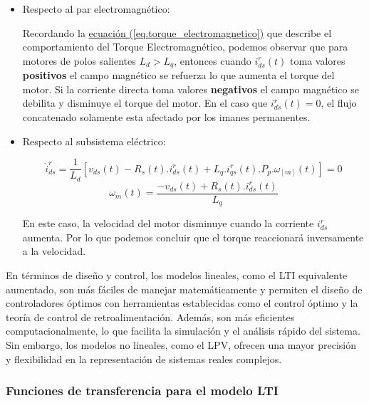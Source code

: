 \documentclass{article}
\begin{document}
\begin{itemize}
    
    \item Respecto al par electromagnético:
    
    Recordando la
    \hyperref[eq.torque_electromagnetico]{ecuación (\ref*{eq.torque_electromagnetico})}
    que describe el comportamiento del Torque Electromagnético,
    podemos observar que para motores de polos salientes $L_{d} > L_{q}$, entonces cuando $i_{ds}^r(t)$
    toma valores \textbf{positivos} el campo magnético se refuerza lo que aumenta el torque del
    motor. Si la corriente directa toma valores \textbf{negativos} el campo magnético se debilita 
    y disminuye el torque del motor. En el caso que $i_{ds}^r(t) = 0$, el flujo concatenado solamente esta afectado por 
    los imanes permanentes.

    \item Respecto al subsistema eléctrico:

    \begin{equation}
        \dot{i}_{ds}^r = \frac{1}{L_{d}}[v_{ds}(t) - R_{s}(t).i_{ds}^r(t) + L_{q}.i_{qs}^r(t).P_{p}.\omega_[m](t)] = 0
    \end{equation}
    \begin{equation}
        \omega_{m}(t) = \frac{-v_{ds}(t) + R_{s}(t).i_{ds}^r(t)}{L_{q}}
    \end{equation}

    En este caso, la velocidad del motor disminuye cuando la corriente $i_{ds}^r$ 
    aumenta. Por lo que podemos concluir que el torque reaccionará inversamente 
    a la velocidad.

\end{itemize}

En términos de diseño y control, los modelos lineales, como el LTI equivalente aumentado, son más 
fáciles de manejar matemáticamente y permiten el diseño de controladores óptimos con herramientas 
establecidas como el control óptimo y la teoría de control de retroalimentación. Además, son más 
eficientes computacionalmente, lo que facilita la simulación y el análisis rápido del sistema. Sin 
embargo, los modelos no lineales, como el LPV, ofrecen una mayor precisión y flexibilidad en la 
representación de sistemas reales complejos.


\subsubsection{Funciones de transferencia para el modelo LTI}
\end{document}
